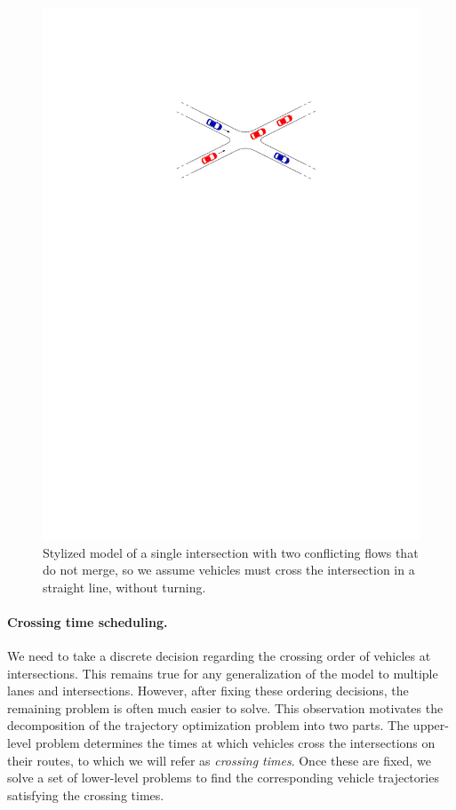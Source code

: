 \documentclass[a4paper]{report}
\theoremstyle{definition}
\theoremstyle{plain}
\begin{document}
\begin{figure}
  \centering
  \includegraphics[scale=1]{figures/intersection-nice}
  \caption{Stylized model of a single intersection with two conflicting flows
    that do not merge, so we assume vehicles must cross the intersection in a
    straight line, without turning.}
\end{figure}


\paragraph{Crossing time scheduling.} We need to take a discrete decision regarding the
crossing order of vehicles at intersections. This remains true for any
generalization of the model to multiple lanes and intersections.
%
However, after fixing these ordering decisions, the remaining problem is often
much easier to solve. This observation motivates the decomposition of the
trajectory optimization problem into two parts.
%
The upper-level problem determines the times at which vehicles cross the
intersections on their routes, to which we will refer as \emph{crossing times}.
%
Once these are fixed, we solve a set of lower-level problems to find the
corresponding vehicle trajectories satisfying the crossing times.
\end{document}
